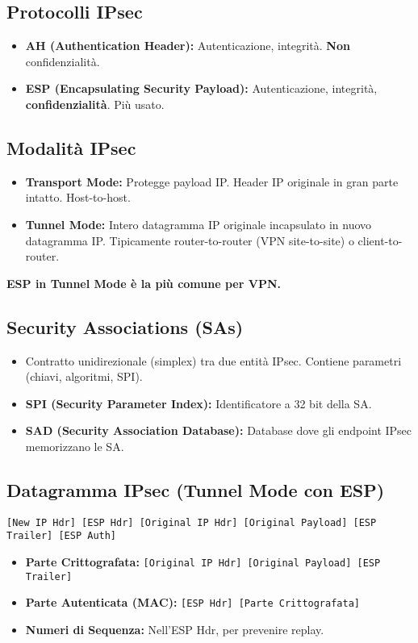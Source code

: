\documentclass{article}
\begin{document}
\begin{enumerate}
\subsection{Protocolli IPsec}
\begin{itemize}
    \item \textbf{AH (Authentication Header):} Autenticazione, integrità. \textbf{Non} confidenzialità.
    \item \textbf{ESP (Encapsulating Security Payload):} Autenticazione, integrità, \textbf{confidenzialità}. Più usato.
\end{itemize}

\subsection{Modalità IPsec}
\begin{itemize}
    \item \textbf{Transport Mode:} Protegge payload IP. Header IP originale in gran parte intatto. Host-to-host.
    \item \textbf{Tunnel Mode:} Intero datagramma IP originale incapsulato in nuovo datagramma IP. Tipicamente router-to-router (VPN site-to-site) o client-to-router.
\end{itemize}
\textbf{ESP in Tunnel Mode è la più comune per VPN.}

\subsection{Security Associations (SAs)}
\begin{itemize}
    \item Contratto unidirezionale (simplex) tra due entità IPsec. Contiene parametri (chiavi, algoritmi, SPI).
    \item \textbf{SPI (Security Parameter Index):} Identificatore a 32 bit della SA.
    \item \textbf{SAD (Security Association Database):} Database dove gli endpoint IPsec memorizzano le SA.
\end{itemize}

\subsection{Datagramma IPsec (Tunnel Mode con ESP)}
\texttt{[New IP Hdr] [ESP Hdr] [Original IP Hdr] [Original Payload] [ESP Trailer] [ESP Auth]}
\begin{itemize}
    \item \textbf{Parte Crittografata:} \texttt{[Original IP Hdr] [Original Payload] [ESP Trailer]}
    \item \textbf{Parte Autenticata (MAC):} \texttt{[ESP Hdr] [Parte Crittografata]}
    \item \textbf{Numeri di Sequenza:} Nell'ESP Hdr, per prevenire replay.
\end{itemize}


\end{enumerate}
\end{document}
